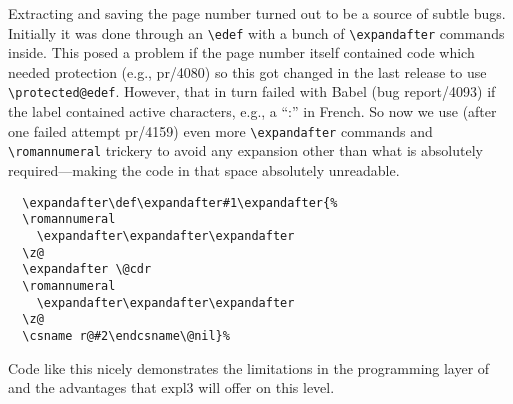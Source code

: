 \documentclass{ltnews}
\begin{document}
 Extracting and saving the page number turned out to be a source of subtle
 bugs. Initially it was done through an \verb"\edef" with a bunch of
\verb"\expandafter" commands inside. This posed a problem if the page number
 itself contained code which needed protection (e.g., pr/4080) so this got
 changed in the last release to use \verb"\protected@edef". However, that in turn failed with Babel
(bug report/4093)   if the label contained active characters, e.g., a ``:'' in French. So now
we use (after one failed attempt pr/4159) even more \verb"\expandafter" commands and \verb"\romannumeral" trickery to avoid any expansion other
 than what is absolutely  required---making the code in that space absolutely unreadable.
\begin{verbatim}
  \expandafter\def\expandafter#1\expandafter{%
  \romannumeral
    \expandafter\expandafter\expandafter
  \z@
  \expandafter \@cdr
  \romannumeral
    \expandafter\expandafter\expandafter
  \z@
  \csname r@#2\endcsname\@nil}%
\end{verbatim}
Code like this nicely demonstrates the limitations in the programming layer of \LaTeXe{} and the advantages that  \textsf{expl3} will offer on this level.
\end{document}
